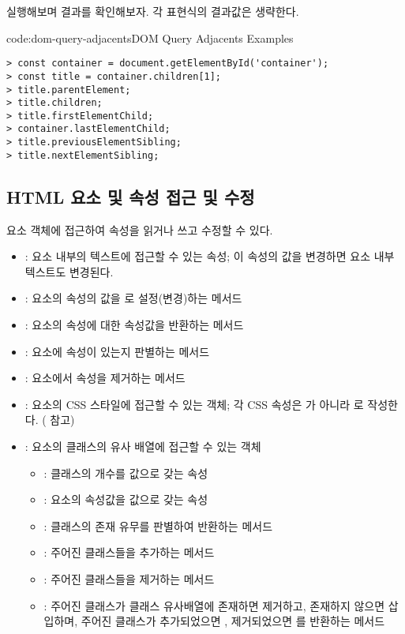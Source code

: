 \를 실행해보며 결과를 확인해보자. 각 표현식의 결과값은 생략한다.

\begin{codeenv}{code:dom-query-adjacents}{DOM Query Adjacents Examples}\begin{verbatim}
> const container = document.getElementById('container');
> const title = container.children[1];
> title.parentElement;
> title.children;
> title.firstElementChild;
> container.lastElementChild;
> title.previousElementSibling;
> title.nextElementSibling;
\end{verbatim}
\end{codeenv}

\subsection*{HTML 요소 및 속성 접근 및 수정}

요소 객체에 접근하여 속성을 읽거나 쓰고 수정할 수 있다.

\begin{itemize}
    \item {}: 요소 내부의 텍스트에 접근할 수 있는 속성; 이 속성의 값을 변경하면 요소 내부 텍스트도 변경된다.
    \item {}: 요소의  속성의 값을 로 설정(변경)하는 메서드
    \item {}: 요소의  속성에 대한 속성값을 반환하는 메서드
    \item {}: 요소에  속성이 있는지 판별하는 메서드
    \item {}: 요소에서  속성을 제거하는 메서드
    \item {}: 요소의 CSS 스타일에 접근할 수 있는 객체; 각 CSS 속성은 가 아니라 로 작성한다. ( 참고)
    \newpage
    \item {}: 요소의 클래스의 유사 배열에 접근할 수 있는 객체
    \begin{itemize}
      \item {}: 클래스의 개수를 값으로 갖는 속성
      \item {}: 요소의  속성값을 값으로 갖는 속성
      \item {}: 클래스의 존재 유무를 판별하여 반환하는 메서드
      \item {}: 주어진 클래스들을 추가하는 메서드
      \item {}: 주어진 클래스들을 제거하는 메서드
      \item {}: 주어진 클래스가 클래스 유사배열에 존재하면 제거하고, 존재하지 않으면 삽입하며, 주어진 클래스가 추가되었으면 , 제거되었으면 를 반환하는 메서드
    \end{itemize}
\end{itemize}

